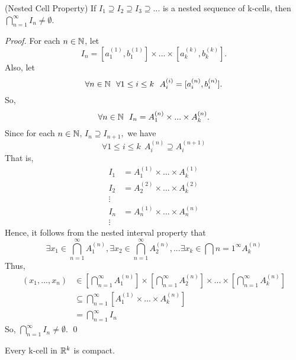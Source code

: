 	\begin{theorem} (Nested Cell Property)
		If $I_1 \supseteq I_2 \supseteq I_3 \supseteq ...$ is a nested sequence of k-cells, then $\bigcap \limits_{n=1}^\infty I_n \not = \emptyset$.
	\end{theorem}
	\begin{proof}
		For each $n\in \mathbb{N}$, let
		$$I_n = [a_1 ^{(1)}, b_1 ^{(1)}] \times ... \times [a_k ^{(k)}, b_k ^{(k)}].$$
		Also, let
		$$ \forall n \in \mathbb{N} ~~\forall 1 \leq i \leq k ~~A_i ^{(i)} = [a_i ^{(n)}, b_i^{(n)}].$$
		So, 
		$$ \forall n \in \mathbb{N} ~~I_n = A_1^{(n)} \times ... \times A_k ^{(n)}.$$
		Since for each $n \in \mathbb{N}$, $I_n \supseteq I_{n+1},$ we have
		$$\forall 1 \leq i \leq k ~~ A_i ^{(n)} \supseteq A_i^{(n+1)}$$
		That is,
		\begin{align*}
			I_1 &= A_1^{(1)} \times ... \times A_k ^{(1)} \\
			I_2 &= A_2 ^{(2)} \times ... \times A_k^{(2)} \\
			\vdots \\
			I_n &= A_n^{(1)} \times ... \times A_n^{(n)} \\
			\vdots
		\end{align*}
		Hence, it follows from the nested interval property that
		$$\exists x_1 \in \bigcap \limits_{n=1}^\infty A_1^{(n)}, \exists x_2 \in \bigcap \limits_{n=1}^\infty A_2^{(n)}, ... \exists x_k \in \bigcap \limits{n=1}^{\infty} A_k ^{(n)}$$
		Thus,
		\begin{align*}
			(x_1,...,x_n) &\in \left[\bigcap \limits_{n=1}^\infty A_1^{(n)}\right] \times \left[\bigcap \limits_{n=1}^\infty A_2^{(n)}\right] \times... \times \left[\bigcap \limits_{n=1}^\infty A_k^{(n)}\right] \\
			&\subseteq \bigcap \limits_{n=1}^\infty \left[A_1^{(1)} \times ... \times A_k^{(n)}\right] \\
			&= \bigcap \limits_{n=1}^\infty I_n
		\end{align*}
		So, $\bigcap \limits_{n=1}^\infty I_n \not = \emptyset.$ \qed
	\end{proof}
	
	\begin{theorem}
		Every k-cell in $\mathbb{R} ^k$ is compact.
	\end{theorem}

